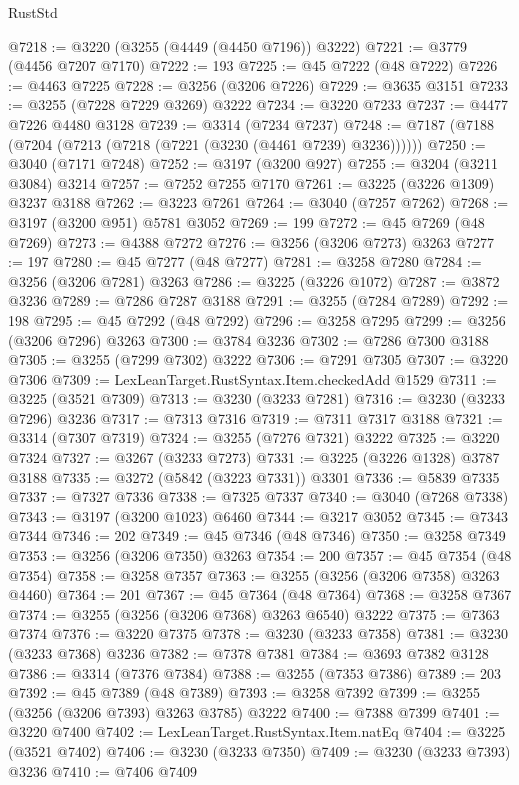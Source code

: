 \begin{lexlean}{RustStd}
\begin{coremodule}
@7218 := @3220 (@3255 (@4449 (@4450 @7196)) @3222)
@7221 := @3779 (@4456 @7207 @7170)
@7222 := 193
@7225 := @45 @7222 (@48 @7222)
@7226 := @4463 @7225
@7228 := @3256 (@3206 @7226)
@7229 := @3635 @3151
@7233 := @3255 (@7228 @7229 @3269) @3222
@7234 := @3220 @7233
@7237 := @4477 @7226 @4480 @3128
@7239 := @3314 (@7234 @7237)
@7248 := @7187 (@7188 (@7204 (@7213 (@7218 (@7221 (@3230 (@4461 @7239) @3236))))))
@7250 := @3040 (@7171 @7248)
@7252 := @3197 (@3200 @927)
@7255 := @3204 (@3211 @3084) @3214
@7257 := @7252 @7255 @7170
@7261 := @3225 (@3226 @1309) @3237 @3188
@7262 := @3223 @7261
@7264 := @3040 (@7257 @7262)
@7268 := @3197 (@3200 @951) @5781 @3052
@7269 := 199
@7272 := @45 @7269 (@48 @7269)
@7273 := @4388 @7272
@7276 := @3256 (@3206 @7273) @3263
@7277 := 197
@7280 := @45 @7277 (@48 @7277)
@7281 := @3258 @7280
@7284 := @3256 (@3206 @7281) @3263
@7286 := @3225 (@3226 @1072)
@7287 := @3872 @3236
@7289 := @7286 @7287 @3188
@7291 := @3255 (@7284 @7289)
@7292 := 198
@7295 := @45 @7292 (@48 @7292)
@7296 := @3258 @7295
@7299 := @3256 (@3206 @7296) @3263
@7300 := @3784 @3236
@7302 := @7286 @7300 @3188
@7305 := @3255 (@7299 @7302) @3222
@7306 := @7291 @7305
@7307 := @3220 @7306
@7309 := LexLeanTarget.RustSyntax.Item.checkedAdd @1529
@7311 := @3225 (@3521 @7309)
@7313 := @3230 (@3233 @7281)
@7316 := @3230 (@3233 @7296) @3236
@7317 := @7313 @7316
@7319 := @7311 @7317 @3188
@7321 := @3314 (@7307 @7319)
@7324 := @3255 (@7276 @7321) @3222
@7325 := @3220 @7324
@7327 := @3267 (@3233 @7273)
@7331 := @3225 (@3226 @1328) @3787 @3188
@7335 := @3272 (@5842 (@3223 @7331)) @3301
@7336 := @5839 @7335
@7337 := @7327 @7336
@7338 := @7325 @7337
@7340 := @3040 (@7268 @7338)
@7343 := @3197 (@3200 @1023) @6460
@7344 := @3217 @3052
@7345 := @7343 @7344
@7346 := 202
@7349 := @45 @7346 (@48 @7346)
@7350 := @3258 @7349
@7353 := @3256 (@3206 @7350) @3263
@7354 := 200
@7357 := @45 @7354 (@48 @7354)
@7358 := @3258 @7357
@7363 := @3255 (@3256 (@3206 @7358) @3263 @4460)
@7364 := 201
@7367 := @45 @7364 (@48 @7364)
@7368 := @3258 @7367
@7374 := @3255 (@3256 (@3206 @7368) @3263 @6540) @3222
@7375 := @7363 @7374
@7376 := @3220 @7375
@7378 := @3230 (@3233 @7358)
@7381 := @3230 (@3233 @7368) @3236
@7382 := @7378 @7381
@7384 := @3693 @7382 @3128
@7386 := @3314 (@7376 @7384)
@7388 := @3255 (@7353 @7386)
@7389 := 203
@7392 := @45 @7389 (@48 @7389)
@7393 := @3258 @7392
@7399 := @3255 (@3256 (@3206 @7393) @3263 @3785) @3222
@7400 := @7388 @7399
@7401 := @3220 @7400
@7402 := LexLeanTarget.RustSyntax.Item.natEq
@7404 := @3225 (@3521 @7402)
@7406 := @3230 (@3233 @7350)
@7409 := @3230 (@3233 @7393) @3236
@7410 := @7406 @7409

\end{coremodule}
\end{lexlean}
